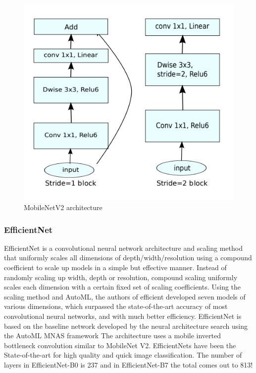\begin{figure}[!h]
    \centering
    \includegraphics[width=1\textwidth]{chapters/chapter02/fig02/mobilenet.png}
    \caption{ MobileNetV2 architecture}
    \label{fig:my_label}
\end{figure}
\subsubsection{EfficientNet}
EfficientNet is a convolutional neural network architecture and scaling method that uniformly scales all dimensions of depth/width/resolution using a compound coefficient to scale up models in a simple but effective manner. Instead of randomly scaling up width, depth or resolution, compound scaling uniformly scales each dimension with a certain fixed set of scaling coefficients. Using the scaling method and AutoML, the authors of efficient developed seven models of various dimensions, which surpassed the state-of-the-art accuracy of most convolutional neural networks, and with much better efficiency.
EfficientNet is based on the baseline network developed by the neural architecture search using the AutoML MNAS framework
The architecture uses a mobile inverted bottleneck convolution similar to MobileNet V2.
EfficientNets have been the State-of-the-art for high quality and quick image classification. \cite{art43}
The number of layers in EfficientNet-B0 is 237 and in EfficientNet-B7 the total comes out to 813!

